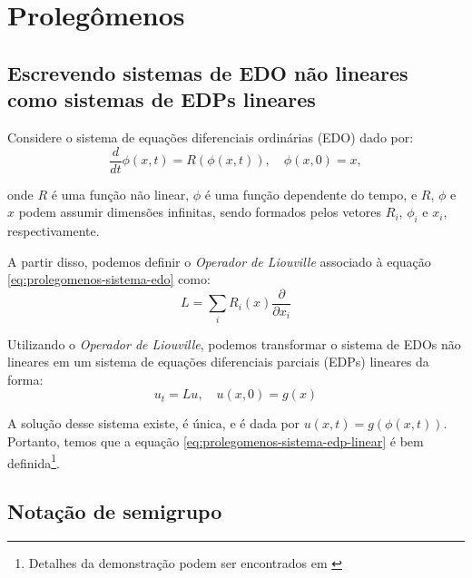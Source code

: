\documentclass[12pt]{article}
\begin{document}

\section{Prolegômenos}
\subsection{Escrevendo sistemas de EDO não lineares como sistemas de EDPs lineares}

Considere o sistema de equações diferenciais ordinárias (EDO) dado por:
\begin{equation}
    \frac{d}{dt} \phi(x,t) = R(\phi(x,t)), \quad \phi(x, 0) = x,
    \label{eq:prolegomenos-sistema-edo}
\end{equation}

onde $R$ é uma função não linear, $\phi$ é uma função dependente do tempo, e $R$, $\phi$ e $x$ podem assumir dimensões infinitas, sendo formados pelos vetores $R_i$, $\phi_i$ e $x_i$, respectivamente.

A partir disso, podemos definir o \textit{Operador de Liouville} associado à equação \eqref{eq:prolegomenos-sistema-edo} como:
\begin{equation}
    L = \sum_i R_i(x) \frac{\partial}{\partial x_i}
    \label{eq:prolegomenos-liouville-operator}
\end{equation}

Utilizando o \textit{Operador de Liouville}, podemos transformar o sistema de EDOs não lineares em um sistema de equações diferenciais parciais (EDPs) lineares da forma:
\begin{equation}
    u_t = Lu, \quad u(x,0) = g(x)
    \label{eq:prolegomenos-sistema-edp-linear}
\end{equation}

A solução desse sistema existe, é única, e é dada por $u(x,t) = g(\phi(x,t))$. Portanto, temos que a equação \eqref{eq:prolegomenos-sistema-edp-linear} é bem definida\footnote{Detalhes da demonstração podem ser encontrados em \citet[p.~181-182]{Chorin2013}}.

\subsection{Notação de semigrupo}
\end{document}
